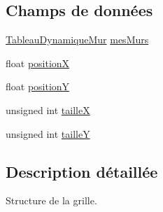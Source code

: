 \subsection*{Champs de données}
\begin{DoxyCompactItemize}
\item 
\hyperlink{structTableauDynamiqueMur}{Tableau\-Dynamique\-Mur} \hyperlink{structGrid_a0462856a88311819d0422a08b9bb0033}{mes\-Murs}
\item 
float \hyperlink{structGrid_a1712b348175d1449f924218abc2c180b}{position\-X}
\item 
float \hyperlink{structGrid_aa084d4ec2894df907e02718c88ab4060}{position\-Y}
\item 
unsigned int \hyperlink{structGrid_ad6ec58066a6303fbc2aa5443840cf067}{taille\-X}
\item 
unsigned int \hyperlink{structGrid_adc12ffc8da211af2444db8a2007e5a7d}{taille\-Y}
\end{DoxyCompactItemize}


\subsection{Description détaillée}
Structure de la grille. 

